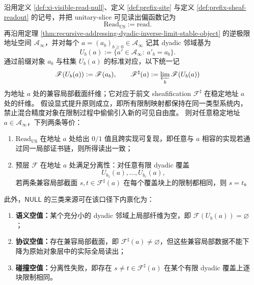\begin{theorem}\label{thm:recursive-addressing-readout-separatedness-null}
沿用定义 \ref{def:xi-visible-read-null}、定义 \ref{def:prefix-site} 与定义 \ref{def:prefix-sheaf-readout} 的记号，并把 unitary-slice 可见读出偏函数记为
\[
\mathrm{Read}_{\mathrm{US}}:=\mathrm{read}.
\]
再沿用定理 \ref{thm:recursive-addressing-dyadic-inverse-limit-stable-object} 的逆极限地址空间 \(\mathcal A_\infty\)，并对每个 \(a=(a_b)_{b\ge 0}\in\mathcal A_\infty\) 记其 dyadic 邻域基为
\[
U_b(a):=\{a'\in\mathcal A_\infty:\ a'_b=a_b\}.
\]
通过前缀对象 \(a_b\) 与柱集 \(U_b(a)\) 的标准对应，以下统一记
\[
\mathscr F(U_b(a)):=\mathscr F(a_b),
\qquad
\mathscr F^\sharp(a):=\varprojlim_b \mathscr F(U_b(a))
\]
为地址 \(a\) 处的兼容局部截面纤维；它对应于前文 sheafification \(\mathscr F^\sharp\) 在稳定地址 \(a\) 处的纤维。
假设显式提升原则成立，即所有限制映射都保持在同一类型系统内，禁止混合精度对象在限制过程中偷偷引入新的可见自由度。
则对任意稳定地址 \(a\in\mathcal A_\infty\)，下列两条等价：
\begin{enumerate}
  \item \(\mathrm{Read}_{\mathrm{US}}\) 在地址 \(a\) 处给出 \(0/1\) 值且跨实现可复现，即任意与 \(a\) 相容的实现若通过同一局部证书链，则所得读出一致；
  \item 预层 \(\mathscr F\) 在地址 \(a\) 处满足分离性：对任意有限 dyadic 覆盖
  \[
  U_{b_1}(a),\dots,U_{b_r}(a),
  \]
  若两条兼容局部截面 \(s,t\in\mathscr F^\sharp(a)\) 在每个覆盖块上的限制都相同，则 \(s=t\)。
\end{enumerate}
此外，\(\mathsf{NULL}\) 的三类来源可在该口径下内禀化为：
\begin{enumerate}
  \item \textbf{语义空值：}某个充分小的 dyadic 邻域上局部纤维为空，即 \(\mathscr F(U_b(a))=\varnothing\)；
  \item \textbf{协议空值：}存在兼容局部截面，即 \(\mathscr F^\sharp(a)\neq\varnothing\)，但这些兼容局部数据不能下降为原始对象层中的实际全局读出；
  \item \textbf{碰撞空值：}分离性失败，即存在 \(s\neq t\in\mathscr F^\sharp(a)\) 在某个有限 dyadic 覆盖上逐块限制相同。
\end{enumerate}
\end{theorem}

